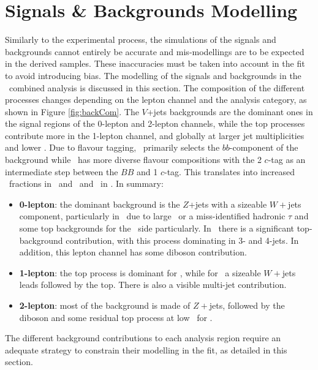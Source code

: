 \section{Signals \& Backgrounds Modelling}\label{sec-mod}
Similarly to the experimental process, the simulations of the signals and backgrounds cannot entirely be accurate and mis-modellings are to be expected in the derived samples. These inaccuracies must be taken into account in the fit to avoid introducing bias. The modelling of the signals and backgrounds in the \vhbc\ combined analysis is discussed in this section. The composition of the different processes changes depending on the lepton channel and the analysis category, as shown in Figure \ref{fig:backCom}. The $V$+jets backgrounds are the dominant ones in the signal regions of the 0-lepton and 2-lepton channels, while the top processes contribute more in the 1-lepton channel, and globally at larger jet multiplicities and lower \ptv. Due to flavour tagging, \vhb\ primarily selects the $bb$-component of the background while \vhc\ has more diverse flavour compositions with the 2 $c$-tag as an intermediate step between the $BB$ and 1 $c$-tag. This translates into increased \vhf\ fractions in \vhb\ and \vmf\ and \vlf\ in \vhc. In summary:
\begin{itemize}
    \item \textbf{0-lepton}: the dominant background is the $Z$+jets with a sizeable $W+$jets component, particularly in \vhc\ due to large \etm\ or a miss-identified hadronic $\tau$ and some top backgrounds for the \vhb\ side particularly. In \vhb\ there is a significant top-background contribution, with this process dominating in 3- and 4-jets. In addition, this lepton channel has some diboson contribution.
    \item \textbf{1-lepton}: the top process is dominant for \vhb, while for \vhc\ a sizeable $W+$jets leads followed by the top. There is also a visible multi-jet contribution.  
    \item \textbf{2-lepton}: most of the background is made of $Z+$jets, followed by the diboson and some residual top process at low \ptv\ for \vhb. 
\end{itemize}
The different background contributions to each analysis region require an adequate strategy to constrain their modelling in the fit, as detailed in this section.
  
